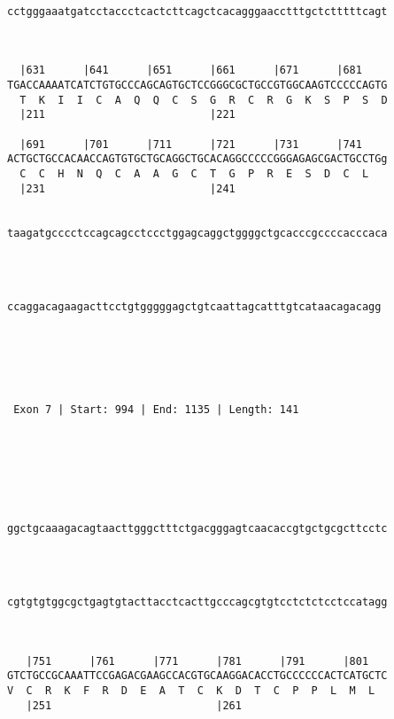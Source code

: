 \documentclass{article}
\begin{document}
\begin{Verbatim}
                                                            
cctgggaaatgatcctaccctcactcttcagctcacagggaacctttgctctttttcagt
                                                            
                                                            
   
  |631      |641      |651      |661      |671      |681    
TGACCAAAATCATCTGTGCCCAGCAGTGCTCCGGGCGCTGCCGTGGCAAGTCCCCCAGTG
  T  K  I  I  C  A  Q  Q  C  S  G  R  C  R  G  K  S  P  S  D
  |211                          |221                        
   
  |691      |701      |711      |721      |731      |741    
ACTGCTGCCACAACCAGTGTGCTGCAGGCTGCACAGGCCCCCGGGAGAGCGACTGCCTGg
  C  C  H  N  Q  C  A  A  G  C  T  G  P  R  E  S  D  C  L   
  |231                          |241                        
   
                                                            
taagatgcccctccagcagcctccctggagcaggctggggctgcacccgccccacccaca
                                                            
                                                            
   
                                                           
ccaggacagaagacttcctgtgggggagctgtcaattagcatttgtcataacagacagg
                                                           
                                                           
  



 Exon 7 | Start: 994 | End: 1135 | Length: 141 





   
                                                            
ggctgcaaagacagtaacttgggctttctgacgggagtcaacaccgtgctgcgcttcctc
                                                            
                                                            
   
                                                            
cgtgtgtggcgctgagtgtacttacctcacttgcccagcgtgtcctctctcctccatagg
                                                            
                                                            
   
   |751      |761      |771      |781      |791      |801   
GTCTGCCGCAAATTCCGAGACGAAGCCACGTGCAAGGACACCTGCCCCCCACTCATGCTC
V  C  R  K  F  R  D  E  A  T  C  K  D  T  C  P  P  L  M  L  
   |251                          |261                       
   

\end{Verbatim}
\end{document}
